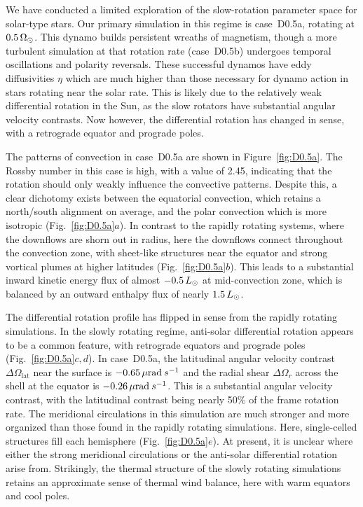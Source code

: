 We have conducted a limited exploration of the slow-rotation parameter
space  for solar-type stars. Our primary simulation in this regime is case~D0.5a,
rotating at $0.5\thinspace\Omega_\odot$.  This dynamo builds
persistent wreaths of magnetism, though a more turbulent simulation at
that rotation rate (case~D0.5b) undergoes temporal oscillations and
polarity reversals.   These successful dynamos have eddy diffusivities
$\eta$ which are much higher than those necessary for dynamo action in
stars rotating near the solar rate.  This is likely due to the
relatively weak differential rotation in the Sun, as the slow rotators
have substantial angular velocity contrasts.  Now however, the
differential rotation has changed in sense, with a retrograde equator
and prograde poles.


The patterns of convection in case~D0.5a are shown in
Figure~\ref{fig:D0.5a}.  The Rossby number in this case is high, with
a value of 2.45, indicating that the rotation should only weakly
influence the convective patterns.  Despite this, a clear dichotomy
exists between the equatorial convection, which retains a
north/south alignment on average, and the polar convection which is
more isotropic (Fig.~\ref{fig:D0.5a}$a$).  In
contrast to the rapidly rotating systems, where the downflows are
shorn out in radius, here the downflows
connect throughout the convection zone, with sheet-like structures
near the equator and strong vortical plumes at higher latitudes
(Fig.~\ref{fig:D0.5a}$b$).  This
leads to a substantial inward kinetic energy flux of almost
$-0.5\thinspace L_\odot$ at mid-convection zone, which is balanced by
an outward enthalpy flux of nearly $1.5\thinspace L_\odot$.

The differential rotation profile has flipped in sense from the
rapidly rotating simulations.  In the slowly rotating regime,
anti-solar differential rotation appears to be a common feature, with
retrograde equators and prograde poles (Fig.~\ref{fig:D0.5a}$c,d$).  
In case~D0.5a, the latitudinal angular velocity contrast $\Delta
\Omega_\mathrm{lat}$  near the surface is $-0.65 \thinspace\mu \mathrm{rad}\: s^{-1}$
and the radial shear $\Delta \Omega_r$ across the shell at the equator 
is $-0.26\thinspace\mu \mathrm{rad}\: s^{-1}$.  This is a substantial
angular velocity contrast, with the latitudinal contrast being nearly
50\% of the frame rotation rate.  The meridional circulations in this
simulation are much stronger and more organized than those found in
the rapidly rotating simulations.  Here, single-celled structures fill
each hemisphere (Fig.~\ref{fig:D0.5a}$e$).  At present, it is unclear
where either the strong meridional circulations or the anti-solar differential
rotation arise from.  Strikingly, the thermal structure of the slowly
rotating simulations retains an approximate sense of thermal wind
balance, here with warm equators and cool poles.  

